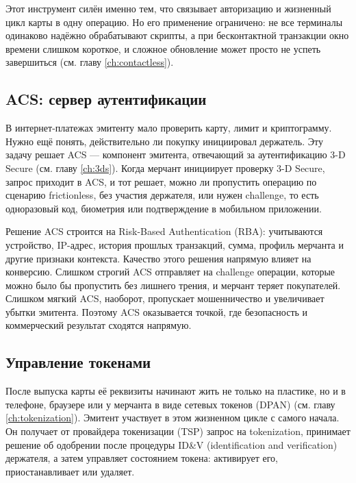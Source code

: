 Этот инструмент силён именно тем, что связывает авторизацию
и жизненный цикл карты в одну операцию. Но его применение
ограничено: не все терминалы одинаково надёжно обрабатывают
скрипты, а при бесконтактной транзакции окно времени слишком
короткое, и сложное обновление может просто не успеть
завершиться (см. главу \ref{ch:contactless}).

\subsection*{ACS: сервер аутентификации}

В интернет-платежах эмитенту мало проверить карту, лимит
и криптограмму. Нужно ещё понять, действительно ли покупку
инициировал держатель. Эту задачу решает ACS --- компонент
эмитента, отвечающий за аутентификацию 3-D Secure
(см. главу \ref{ch:3ds}). Когда мерчант инициирует проверку
3-D Secure, запрос приходит в ACS, и тот решает, можно ли
пропустить операцию по сценарию frictionless, без участия
держателя, или нужен challenge, то есть одноразовый код, биометрия
или подтверждение в мобильном приложении.\cite{emvco-3ds,emvco-3ds-whitepaper}

Решение ACS строится на Risk-Based Authentication (RBA):
учитываются устройство, IP-адрес, история прошлых транзакций,
сумма, профиль мерчанта и другие признаки контекста. Качество
этого решения напрямую влияет на конверсию. Слишком строгий ACS
отправляет на challenge операции, которые можно было бы пропустить
без лишнего трения, и мерчант теряет покупателей. Слишком мягкий
ACS, наоборот, пропускает мошенничество и увеличивает убытки
эмитента.
Поэтому ACS оказывается точкой, где безопасность и коммерческий
результат сходятся напрямую.\cite{emvco-3ds-whitepaper}

\subsection*{Управление токенами}

После выпуска карты её реквизиты начинают жить не только
на пластике, но и в телефоне, браузере или у мерчанта
в виде сетевых токенов (DPAN) (см. главу \ref{ch:tokenization}).
Эмитент участвует в этом жизненном цикле с самого начала.
Он получает от провайдера токенизации (TSP) запрос
на tokenization, принимает решение об одобрении после
процедуры ID\&V (identification and verification) держателя,
а затем управляет состоянием токена: активирует его,
приостанавливает или удаляет.\cite{emvco-payment-tokenisation,visa-vts,nspk-tsp}

